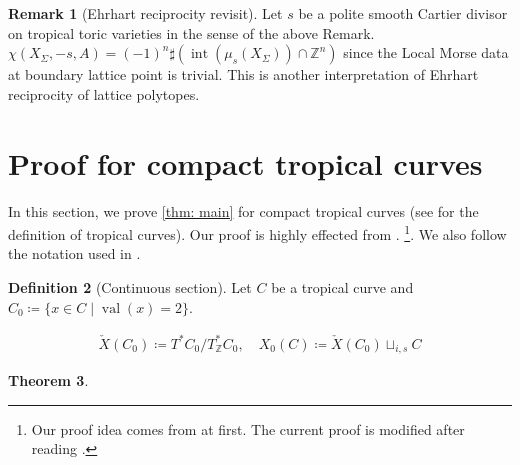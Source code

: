 \documentclass[a4paper,dvipdfmx,reqno,12pt]{amsart}
\theoremstyle{definition}
\newtheorem{Thm}{Theorem}[section]
\newtheorem{Def}[Thm]{Definition}
\newtheorem{Rmk}[Thm]{Remark}
\newcommand{\deq}{\coloneqq}
\newcommand{\Z}{\mathbb{Z}}%
\newcommand{\opn}[1]{\operatorname{#1}}
\numberwithin{equation}{section}
\begin{document}
\begin{Rmk}[{Ehrhart reciprocity revisit}]
Let $s$ be a polite smooth Cartier divisor on 
tropical toric varieties in the sense of the above Remark.
$\chi(X_{\Sigma},-s,A)=(-1)^{n}\sharp (\opn{int}(\mu_s(X_{\Sigma}))\cap \Z^{n})$ since
the Local Morse data at boundary lattice point is trivial.
This is another interpretation of Ehrhart reciprocity of 
lattice polytopes.
\end{Rmk}

\section{Proof for compact tropical curves}
In this section, we prove \cref{thm: main} for 
compact tropical curves
(see \cite{mikhalkinTropicalCurvesTheir2008a} 
for the definition of tropical curves).
Our proof is highly effected from 
\cite{knill2012graph,MR2676658,auroux2022lagrangian}.
\footnote{Our proof idea comes from 
\cite{knill2012graph,MR2676658} at first.  
The current proof is modified after reading 
\cite{auroux2022lagrangian}.}.
We also follow the notation used in 
\cite{auroux2022lagrangian}.

\begin{Def}[{Continuous section}]
Let $C$ be a tropical curve and 
$C_{0}\deq \{x\in C\mid \opn{val}(x)=2\}$.

\begin{align}
\check{X}(C_0)\deq T^{*}C_0/T^{*}_{\Z}C_0, \quad 
X_0(C)\deq \check{X}(C_0)\sqcup_{i,s}C
\end{align}

\end{Def}

\begin{Thm}


\end{Thm}
\end{document}

